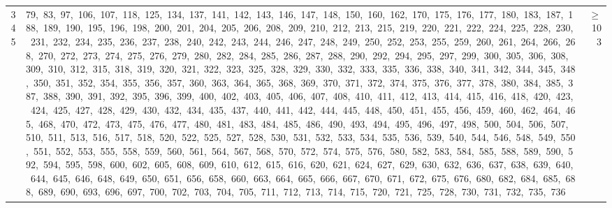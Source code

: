 \begin{longtable}{c|p{}|r}
345 & 79,\ 83,\ 97,\ 106,\ 107,\ 118,\ 125,\ 134,\ 137,\ 141,\ 142,\ 143,\ 146,\ 147,\ 148,\ 150,\ 160,\ 162,\ 170,\ 175,\ 176,\ 177,\ 180,\ 183,\ 187,\ 188,\ 189,\ 190,\ 195,\ 196,\ 198,\ 200,\ 201,\ 204,\ 205,\ 206,\ 208,\ 209,\ 210,\ 212,\ 213,\ 215,\ 219,\ 220,\ 221,\ 222,\ 224,\ 225,\ 228,\ 230,\ 231,\ 232,\ 234,\ 235,\ 236,\ 237,\ 238,\ 240,\ 242,\ 243,\ 244,\ 246,\ 247,\ 248,\ 249,\ 250,\ 252,\ 253,\ 255,\ 259,\ 260,\ 261,\ 264,\ 266,\ 268,\ 270,\ 272,\ 273,\ 274,\ 275,\ 276,\ 279,\ 280,\ 282,\ 284,\ 285,\ 286,\ 287,\ 288,\ 290,\ 292,\ 294,\ 295,\ 297,\ 299,\ 300,\ 305,\ 306,\ 308,\ 309,\ 310,\ 312,\ 315,\ 318,\ 319,\ 320,\ 321,\ 322,\ 323,\ 325,\ 328,\ 329,\ 330,\ 332,\ 333,\ 335,\ 336,\ 338,\ 340,\ 341,\ 342,\ 344,\ 345,\ 348,\ 350,\ 351,\ 352,\ 354,\ 355,\ 356,\ 357,\ 360,\ 363,\ 364,\ 365,\ 368,\ 369,\ 370,\ 371,\ 372,\ 374,\ 375,\ 376,\ 377,\ 378,\ 380,\ 384,\ 385,\ 387,\ 388,\ 390,\ 391,\ 392,\ 395,\ 396,\ 399,\ 400,\ 402,\ 403,\ 405,\ 406,\ 407,\ 408,\ 410,\ 411,\ 412,\ 413,\ 414,\ 415,\ 416,\ 418,\ 420,\ 423,\ 424,\ 425,\ 427,\ 428,\ 429,\ 430,\ 432,\ 434,\ 435,\ 437,\ 440,\ 441,\ 442,\ 444,\ 445,\ 448,\ 450,\ 451,\ 455,\ 456,\ 459,\ 460,\ 462,\ 464,\ 465,\ 468,\ 470,\ 472,\ 473,\ 475,\ 476,\ 477,\ 480,\ 481,\ 483,\ 484,\ 485,\ 486,\ 490,\ 493,\ 494,\ 495,\ 496,\ 497,\ 498,\ 500,\ 504,\ 506,\ 507,\ 510,\ 511,\ 513,\ 516,\ 517,\ 518,\ 520,\ 522,\ 525,\ 527,\ 528,\ 530,\ 531,\ 532,\ 533,\ 534,\ 535,\ 536,\ 539,\ 540,\ 544,\ 546,\ 548,\ 549,\ 550,\ 551,\ 552,\ 553,\ 555,\ 558,\ 559,\ 560,\ 561,\ 564,\ 567,\ 568,\ 570,\ 572,\ 574,\ 575,\ 576,\ 580,\ 582,\ 583,\ 584,\ 585,\ 588,\ 589,\ 590,\ 592,\ 594,\ 595,\ 598,\ 600,\ 602,\ 605,\ 608,\ 609,\ 610,\ 612,\ 615,\ 616,\ 620,\ 621,\ 624,\ 627,\ 629,\ 630,\ 632,\ 636,\ 637,\ 638,\ 639,\ 640,\ 644,\ 645,\ 646,\ 648,\ 649,\ 650,\ 651,\ 656,\ 658,\ 660,\ 663,\ 664,\ 665,\ 666,\ 667,\ 670,\ 671,\ 672,\ 675,\ 676,\ 680,\ 682,\ 684,\ 685,\ 688,\ 689,\ 690,\ 693,\ 696,\ 697,\ 700,\ 702,\ 703,\ 704,\ 705,\ 711,\ 712,\ 713,\ 714,\ 715,\ 720,\ 721,\ 725,\ 728,\ 730,\ 731,\ 732,\ 735,\ 736 & $\ge$ 103 \\

\end{longtable}
